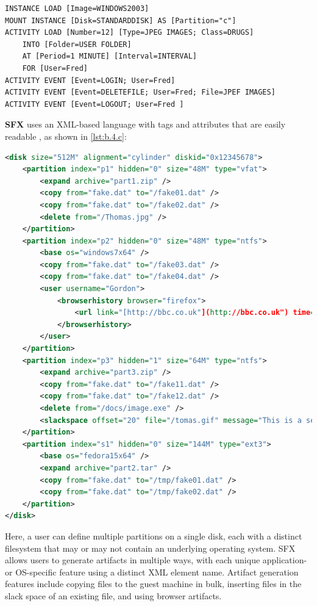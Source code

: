 \documentclass[letterpaper,12pt]{report}
\begin{document}
\begin{lstlisting}[label={lst:b.4.b}, caption={Extension of the D-FET declarative scenario with events \cite{williamCloudbasedDigitalForensics2011}}, ]
INSTANCE LOAD [Image=WINDOWS2003] 
MOUNT INSTANCE [Disk=STANDARDDISK] AS [Partition="c"] 
ACTIVITY LOAD [Number=12] [Type=JPEG IMAGES; Class=DRUGS] 
    INTO [Folder=USER FOLDER] 
    AT [Period=1 MINUTE] [Interval=INTERVAL] 
    FOR [User=Fred]
ACTIVITY EVENT [Event=LOGIN; User=Fred] 
ACTIVITY EVENT [Event=DELETEFILE; User=Fred; File=JPEF IMAGES] 
ACTIVITY EVENT [Event=LOGOUT; User=Fred ]
\end{lstlisting}

\textbf{SFX} uses an XML-based language with tags and attributes that
are easily readable \cite{russellForensicImageDescription2012}, as
shown in \autoref{lst:b.4.c}:

\begin{lstlisting}[label={lst:b.4.c}, caption={Sample SFX declarative scenario expressed as XML \cite{russellForensicImageDescription2012}}, language=XML]
<disk size="512M" alignment="cylinder" diskid="0x12345678">
    <partition index="p1" hidden="0" size="48M" type="vfat">
        <expand archive="part1.zip" />
        <copy from="fake.dat" to="/fake01.dat" />
        <copy from="fake.dat" to="/fake02.dat" />
        <delete from="/Thomas.jpg" />
    </partition>
    <partition index="p2" hidden="0" size="48M" type="ntfs">
        <base os="windows7x64" />
        <copy from="fake.dat" to="/fake03.dat" />
        <copy from="fake.dat" to="/fake04.dat" />
        <user username="Gordon">
            <browserhistory browser="firefox">
                <url link="[http://bbc.co.uk"](http://bbc.co.uk") time="13:14:00 1 Jan 2013" />
            </browserhistory>
        </user>
    </partition>
    <partition index="p3" hidden="1" size="64M" type="ntfs">
        <expand archive="part3.zip" />
        <copy from="fake.dat" to="/fake11.dat" />
        <copy from="fake.dat" to="/fake12.dat" />
        <delete from="/docs/image.exe" />
        <slackspace offset="20" file="/tomas.gif" message="This is a secret message" />
    </partition>
    <partition index="s1" hidden="0" size="144M" type="ext3">
        <base os="fedora15x64" />
        <expand archive="part2.tar" />
        <copy from="fake.dat" to="/tmp/fake01.dat" />
        <copy from="fake.dat" to="/tmp/fake02.dat" />
    </partition>
</disk>
\end{lstlisting}

Here, a user can define multiple partitions on a single disk, each with
a distinct filesystem that may or may not contain an underlying
operating system. SFX allows users to generate artifacts in multiple
ways, with each unique application- or OS-specific feature using a
distinct XML element name. Artifact generation features include copying
files to the guest machine in bulk, inserting files in the slack space
of an existing file, and using browser artifacts.
\end{document}
